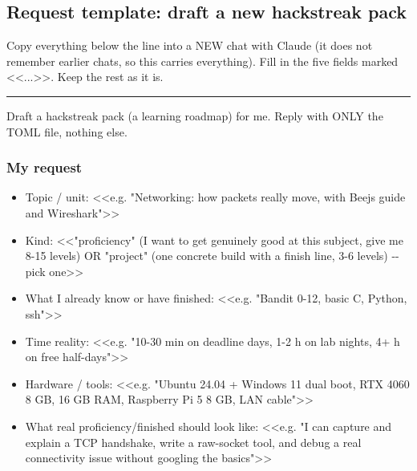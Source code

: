 \hypertarget{new-unit-request-template-request-template-draft-a-new-hackstreak-pack}{%
\subsection{Request template: draft a new hackstreak
pack}\label{new-unit-request-template-request-template-draft-a-new-hackstreak-pack}}

Copy everything below the line into a NEW chat with Claude (it does not
remember earlier chats, so this carries everything). Fill in the five
fields marked \textless\textless...\textgreater\textgreater. Keep the
rest as it is.

\begin{center}\rule{0.5\linewidth}{0.5pt}\end{center}

Draft a hackstreak pack (a learning roadmap) for me. Reply with ONLY the
TOML file, nothing else.

\hypertarget{new-unit-request-template-my-request}{%
\subsubsection{My request}\label{new-unit-request-template-my-request}}

\begin{itemize}
\tightlist
\item
  Topic / unit: \textless\textless e.g. "Networking: how packets really
  move, with Beej\textquotesingle s guide and
  Wireshark"\textgreater\textgreater{}
\item
  Kind: \textless\textless"proficiency" (I want to get genuinely good at
  this subject, give me 8-15 levels) OR "project" (one concrete build
  with a finish line, 3-6 levels) -\/- pick
  one\textgreater\textgreater{}
\item
  What I already know or have finished: \textless\textless e.g. "Bandit
  0-12, basic C, Python, ssh"\textgreater\textgreater{}
\item
  Time reality: \textless\textless e.g. "10-30 min on deadline days, 1-2
  h on lab nights, 4+ h on free half-days"\textgreater\textgreater{}
\item
  Hardware / tools: \textless\textless e.g. "Ubuntu 24.04 + Windows 11
  dual boot, RTX 4060 8 GB, 16 GB RAM, Raspberry Pi 5 8 GB, LAN
  cable"\textgreater\textgreater{}
\item
  What real proficiency/finished should look like:
  \textless\textless e.g. "I can capture and explain a TCP handshake,
  write a raw-socket tool, and debug a real connectivity issue without
  googling the basics"\textgreater\textgreater{}
\end{itemize}

